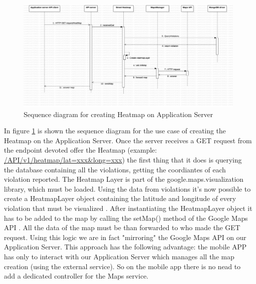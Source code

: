 \begin{figure}[H]
\centering
\includegraphics[width=\textwidth]{Images/DDSeqSeverMap.png}
\caption{\label{fig:DDSeqSeverMap} Sequence diagram for creating Heatmap on Application Server}
\end{figure}

In figure \ref{fig:DDSeqSeverMap} is shown the sequence diagram for the use case of creating the Heatmap on the Application Server.
Once the server receives a GET request from the endpoint devoted offer the Heatmap (example: \url{/API/v1/heatmap/lat=xxx&long=xxx}) the first thing that it does is querying the database containing all the violations, getting the coordiantes of each violation reported. The Heatmap Layer is part of the \textcolor{poliblue}{google.maps.visualization} library, which must be loaded. Using the data from violations it's now possible to create a \textcolor{poliblue}{HeatmapLayer} object containing the latitude and longitude of every violation that must be visualized \cite{GMapsHeat}. After instantiating the \textcolor{poliblue}{HeatmapLayer} object it has to be added to the map by calling the \textcolor{poliblue}{setMap()} method of the Google Maps API \cite{GMapsHeat}. All the data of the map must be than forwarded to who made the GET request.
Using this logic we are in fact "mirroring" the Google Maps API on our Application Server. This approach has the following advantage: the mobile APP has only to interact with our Application Server which manages all the map creation (using the external service). So on the mobile app there is no nead to add a dedicated controller for the Maps service.

